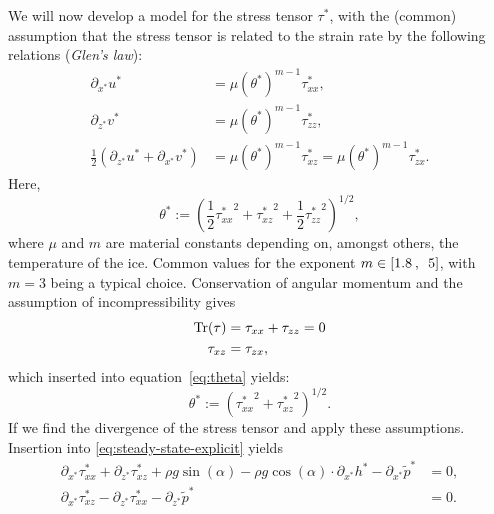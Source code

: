 %
We will now develop a model for the stress tensor $\tau^*$, with the (common) assumption that the stress tensor is related to the strain rate by the following relations (\textit{Glen's law}):
%
\begin{equation}
  \begin{split} \label{eq:Glens_law}
    \partial_{x^*} u^* &= \mu(\theta^*)^{m-1} \tau_{xx}^*, \\
    \partial_{z^*} v^* &= \mu(\theta^*)^{m-1} \tau_{zz}^*, \\
    \frac{1}{2}(\partial_{z^*} u^* + \partial_{x^*} v^*) &= \mu(\theta^*)^{m-1} \tau_{xz}^* = \mu(\theta^*)^{m-1} \tau_{zx}^*.
  \end{split}
\end{equation}
%
Here,
%
\begin{equation} \label{eq:theta}
  \theta^* := \left( \frac{1}{2} {\tau_{xx}^*}^2 + {\tau_{xz}^*}^2 + \frac{1}{2} {\tau_{zz}^*}^2 \right) ^{1/2},
\end{equation}
%
where $\mu$ and $m$ are material constants depending on, amongst others, the temperature of the ice. Common values for the exponent $m \in \left[1.8\hspace{0.2em},\enspace5\right]$, with $m = 3$ being a typical choice.
%
Conservation of angular momentum and the assumption of incompressibility gives
%
\begin{subequations}
    \begin{align}
        \operatorname{Tr}(\tau) &= \tau_{xx} + \tau_{zz} = 0 \label{eq:incompressible-tensor} \\
        \tau_{xz} &= \tau_{zx}, \label{eq:non-rotational-tensor}
    \end{align}
\end{subequations}
%
which inserted into equation~\eqref{eq:theta} yields:
%
\begin{equation} \label{eq:theta_adjusted}
  \theta^* := \left( {\tau_{xx}^*}^2 + {\tau_{xz}^*}^2 \right) ^{1/2}.
\end{equation}
%
If we find the divergence of the stress tensor and apply these assumptions. Insertion into \eqref{eq:steady-state-explicit} yields
%
\begin{equation}
  \begin{split} \label{eq:steady-state-explicit-divergence}
    \partial_{x^*} \tau_{xx}^* + \partial_{z^*} \tau_{xz}^* + \rho g \sin(\alpha) - \rho g \cos(\alpha) \cdot \partial_{x^*} h^* - \partial_{x^*} \tilde{p}^* &= 0, \\
    \partial_{x^*} \tau_{xz}^* - \partial_{z^*} \tau_{xx}^* - \partial_{z^*} \tilde{p}^* &= 0.
  \end{split}
\end{equation}
